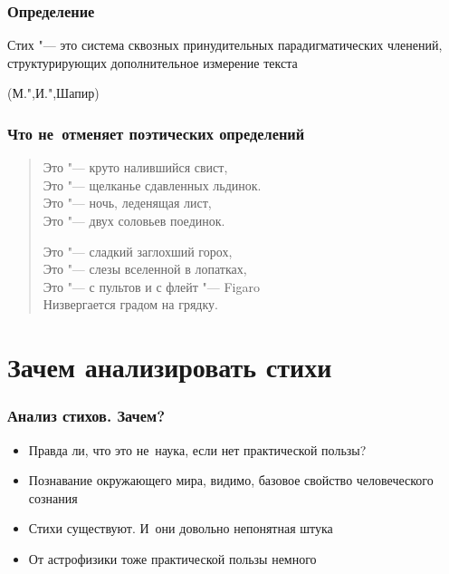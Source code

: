 \documentclass{beamer}
\begin{document}

\begin{frame}
\frametitle{Определение}

{\Large Стих "--- это система сквозных принудительных парадигматических членений, структурирующих дополнительное измерение текста}

\begin{flushleft}
(М.",И.",Шапир)
\end{flushleft}

\end{frame}


\begin{frame}
\frametitle{Что не~отменяет поэтических определений}

\begin{verse}
Это "--- круто налившийся свист,\\
Это "--- щелканье сдавленных льдинок.\\
Это "--- ночь, леденящая лист,\\
Это "--- двух соловьев поединок.

Это "--- сладкий заглохший горох,\\
Это "--- слезы вселенной в лопатках,\\
Это "--- с пультов и с флейт "--- Figaro\\
Низвергается градом на грядку.
\end{verse}

\end{frame}


\section{Зачем анализировать стихи}\label{sec:main}



\begin{frame}
\frametitle{Анализ стихов. Зачем?}

\begin{itemize}
\item Правда ли, что это не~наука, если нет практической пользы?
\end{itemize}

\begin{itemize}
\item Познавание окружающего мира, видимо, базовое свойство человеческого сознания
\item Стихи существуют. И~они довольно непонятная штука
\item От астрофизики тоже практической пользы немного
\end{itemize}

\end{frame}
\end{document}
